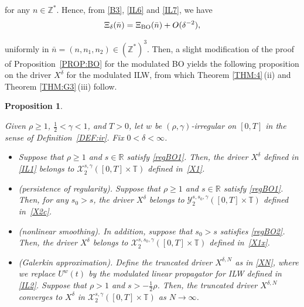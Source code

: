 \documentclass[letterpaper, 11pt,  reqno]{amsart}
\newtheorem{proposition}[theorem]{Proposition}
\newcommand{\1}{\hspace{0.5mm}\text{I}\hspace{0.5mm}}
\newcommand{\noi}{\noindent}
\newcommand{\Z}{\mathbb{Z}}
\newcommand{\R}{\mathbb{R}}
\newcommand{\T}{\mathbb{T}}
\newcommand{\dl}{\delta}
\newcommand{\g}{\gamma}
\newcommand{\cX}{\mathcal{X}}
\newcommand{\cY}{\mathcal{Y}}
\newcommand{\uw}{U^w}
\newcommand{\BO}{\text{\rm BO} }
\numberwithin{equation}{section}
\numberwithin{theorem}{section}
\begin{document}
\noi
for any $n \in \Z^*$.
Hence, from \eqref{B3}, \eqref{IL6} and \eqref{IL7}, 
we have
\begin{align}
\Xi_\dl(\bar n) =  \Xi_\BO(\bar n) + O(\dl^{-2}), 
\label{IL8}
\end{align}

\noi
uniformly in $\bar n = (n, n_1, n_2) \in (\Z^*)^3$.
Then, a slight modification of the proof of Proposition~\ref{PROP:BO}
for the modulated BO
yields the following proposition 
on the driver $X^\dl$ for the modulated ILW, 
from which 
Theorem \ref{THM:4}\,(ii) and Theorem \ref{THM:G3}\,(iii) follow.

\begin{proposition}

\label{PROP:ILW1}


Given $\rho \ge1$,  $\frac 12 < \g < 1$, and $T> 0$, 
let  $w$ be $(\rho,\g)$-irregular on $[0, T]$ in the sense of Definition~\ref{DEF:ir}.
Fix $0 < \dl < \infty$.


\smallskip

\begin{itemize}
\item[(i)]
Suppose that $\rho \ge 1$ and $s \in \R$
satisfy 
\eqref{regBO1}.
Then, 
the driver $X^\dl$ defined in \eqref{IL1}
belongs to $ \cX^{s, \g}_2([0, T]\times \T)$
defined in~\eqref{X1}.

\smallskip
\item[(ii)] \textup{(persistence of regularity).}
Suppose that $\rho \ge 1$ and $s \in \R$
satisfy 
\eqref{regBO1}.
Then, 
for any $s_0 > s$, 
the driver $X^\dl$ 
belongs to 
$\cY^{s, s_0, \g}_{2}([0, T]\times \T)$
defined in~\eqref{X2c}.



\smallskip
\item[(iii)]
\textup{(nonlinear smoothing).}
In addition, suppose that $s_0 > s$ satisfies
\eqref{regBO2}.
Then, 
the driver $X^\dl$ 
belongs to 
$\cX^{s, s_0, \g}_{2}([0, T]\times \T)$
defined in~\eqref{X1x}.



\smallskip
\item[(iv)]
\textup{(Galerkin approximation).}
Define the truncated driver $X^{\dl, N}$
as in \eqref{XN}, 
where we replace
 $\uw(t)$ by the modulated linear propagator
for ILW defined in \eqref{IL2}.
Suppose that $\rho > 1$ and $s > -\frac 12\rho$.
Then, 
the truncated driver $X^{\dl, N}$
 converges
to  $X^\dl$ 
in  $ \cX^{s, \g}_2([0, T]\times \T)$ as $N \to \infty$.


\end{itemize}



\end{proposition}
\end{document}
